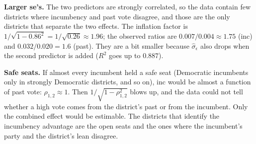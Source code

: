 \documentclass[11pt]{article}
\begin{document}
\begin{examplebox}[title={Question (10/21): why are both se's larger with both predictors? Why would a world of safe seats be a problem?}]
\textbf{Larger se's.} The two predictors are strongly correlated, so the data contain few districts where incumbency and past vote disagree,
and those are the only districts that separate the two effects. The inflation factor is $1/\sqrt{1-0.86^2}=1/\sqrt{0.26}\approx1.96$; the observed
ratios are $0.007/0.004\approx1.75$ (inc) and $0.032/0.020=1.6$ (past). They are a bit smaller because $\hat\sigma_\epsilon$ also drops when the second
predictor is added ($R^2$ goes up to $0.887$).

\textbf{Safe seats.} If almost every incumbent held a safe seat (Democratic incumbents only in strongly Democratic districts, and so on), inc
would be almost a function of past vote: $\rho_{1,2}\approx1$. Then $1/\sqrt{1-\rho_{1,2}^2}$ blows up, and the data could not tell whether a high vote
comes from the district's past or from the incumbent. Only the combined effect would be estimable. The districts that identify the incumbency
advantage are the open seats and the ones where the incumbent's party and the district's lean disagree.
\end{examplebox}
\end{document}
